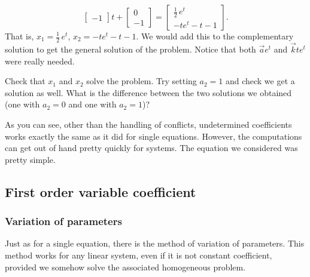 \documentclass{ximera}
\begin{document}
\begin{exampleSol}
\begin{equation*}
\begin{bmatrix}
            -1
        \end{bmatrix}
        t +
        \begin{bmatrix}
            0 \\ 
            -1
        \end{bmatrix}
        =
        \begin{bmatrix}
            \frac{1}{2}\,e^t \\
            -te^t - t - 1
        \end{bmatrix} .
    \end{equation*}
    That is, $x_1 = \frac{1}{2}\,e^t$, $x_2 = -te^t - t - 1$.  We would add this to the complementary solution to get the general solution of the problem.  Notice that both $\vec{a} e^t$ and $\vec{k} te^t$ were really needed.
\end{exampleSol}

\begin{exercise}
Check that $x_1$ and $x_2$ solve the problem.  Try setting $a_2 = 1$ and check we get a solution as well.  What is the difference between the two solutions we obtained (one with $a_2=0$ and one with $a_2=1$)?
\end{exercise}

As you can see, other than the handling of conflicts, undetermined coefficients works exactly the same as it did for single equations.  However, the computations can get out of hand pretty quickly for systems.  The equation we considered was pretty simple.

\subsection{First order variable coefficient}

\subsubsection{Variation of parameters}

Just as for a single equation, there is the method of variation of parameters.
This method works for any linear system, even if it is not constant coefficient, provided we somehow solve the associated homogeneous problem.
\end{document}
